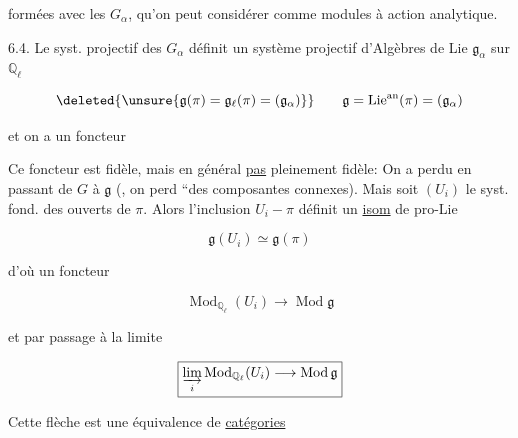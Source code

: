 formées avec les $G_\alpha$, qu'on peut considérer comme modules à action analytique.

6.4. Le syst. projectif des $G_\alpha$ définit un système projectif d'Algèbres de Lie $\mathfrak g_\alpha$ sur $\mathbb Q_\ell$

\[
\deleted{\unsure{\mathfrak g(\pi)=\mathfrak g_\ell(\pi)=(\mathfrak g_\alpha)}}\qquad
\mathfrak g=\operatorname{Lie}^{\mathrm{an}}(\pi)=(\mathfrak g_\alpha)
\]

et on a un foncteur


Ce foncteur est fidèle, mais en général \uline{pas} pleinement fidèle: On a perdu en passant de  $G$ à $\mathfrak g$ (, on perd ``des composantes connexes). Mais soit $(U_i)$ le syst. fond. des  ouverts de $\pi$. Alors l'inclusion $U_i\mathbin{-}\pi$ définit un \uline{isom} de pro-Lie

\[
\mathfrak g(U_i)\simeq\mathfrak g(\pi)
\]

d'où un foncteur

\[
\operatorname{Mod}_{\mathbb Q_\ell}(U_i)\longrightarrow\operatorname{Mod}\mathfrak g
\]

et par passage à la limite

\[
\boxed{\varinjlim_i\operatorname{Mod}_{\mathbb Q_\ell}(U_i)\longrightarrow\operatorname{Mod}\mathfrak g}
\]

Cette flèche est une équivalence de \uline{catégories}
